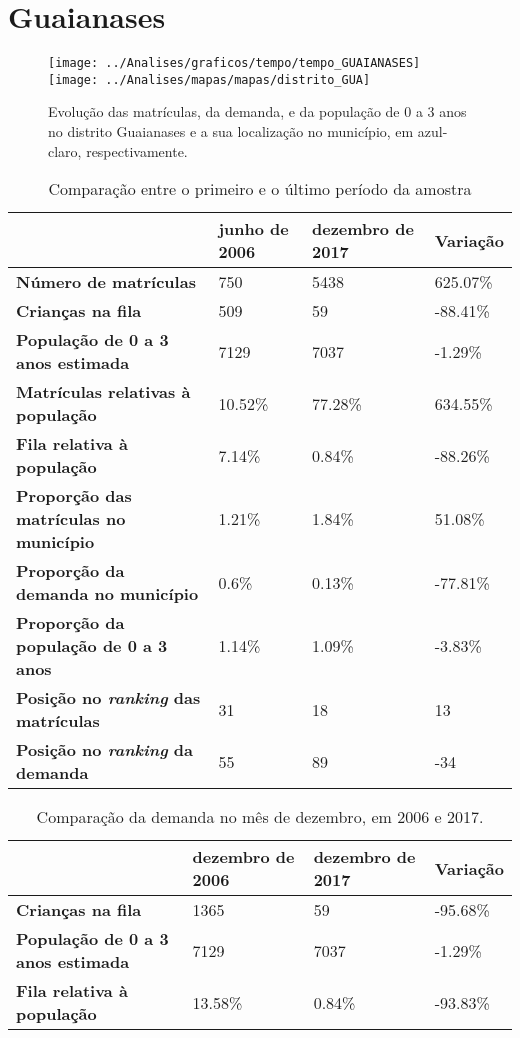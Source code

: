 \section{Guaianases}
\begin{figure}[H]
\centering
\texttt{[image: ../Analises/graficos/tempo/tempo\_GUAIANASES]}
\texttt{[image: ../Analises/mapas/mapas/distrito\_GUA]}
\caption{Evolução das matrículas, da demanda, e da população de 0 a 3 anos no distrito Guaianases e a sua localização no município, em azul-claro, respectivamente.}
\end{figure}
\begin{table}[H]
\begin{tabular}{l|l|l|l}
\textbf{}                                      & \textbf{junho de 2006}       & \textbf{dezembro de 2017}    & \textbf{Variação} \\ \hline
\textbf{Número de matrículas}                  & 750 & 5438 & 625.07\% \\ \hline
\textbf{Crianças na fila}                      & 509 & 59 & -88.41\% \\ \hline
\textbf{População de 0 a 3 anos estimada}      & 7129 & 7037 & -1.29\% \\ \hline
\textbf{Matrículas relativas à população}      & 10.52\% & 77.28\% & 634.55\% \\ \hline
\textbf{Fila relativa à população}             & 7.14\% & 0.84\% & -88.26\% \\ \hline
\textbf{Proporção das matrículas no município} & 1.21\% & 1.84\% & 51.08\% \\ \hline
\textbf{Proporção da demanda no município}     & 0.6\% & 0.13\% & -77.81\% \\ \hline
\textbf{Proporção da população de 0 a 3 anos}  & 1.14\% & 1.09\% & -3.83\% \\ \hline
\textbf{Posição no \textit{ranking} das matrículas}     & 31 & 18 & 13 \\ \hline
\textbf{Posição no \textit{ranking} da demanda}         & 55 & 89 & -34 \\ 
\end{tabular}
\caption{Comparação entre o primeiro e o último período da amostra}
\end{table}
\begin{table}[H]
\begin{tabular}{l|l|l|l}
\textbf{}                                 & \textbf{dezembro de 2006} & \textbf{dezembro de 2017} & \textbf{Variação} \\ \hline
\textbf{Crianças na fila}                      & 1365 & 59 & -95.68\% \\ \hline
\textbf{População de 0 a 3 anos estimada}      & 7129 & 7037 & -1.29\% \\ \hline
\textbf{Fila relativa à população}             & 13.58\% & 0.84\% & -93.83\% \\
\end{tabular}
\caption{Comparação da demanda no mês de dezembro, em 2006 e 2017.}
\end{table}

